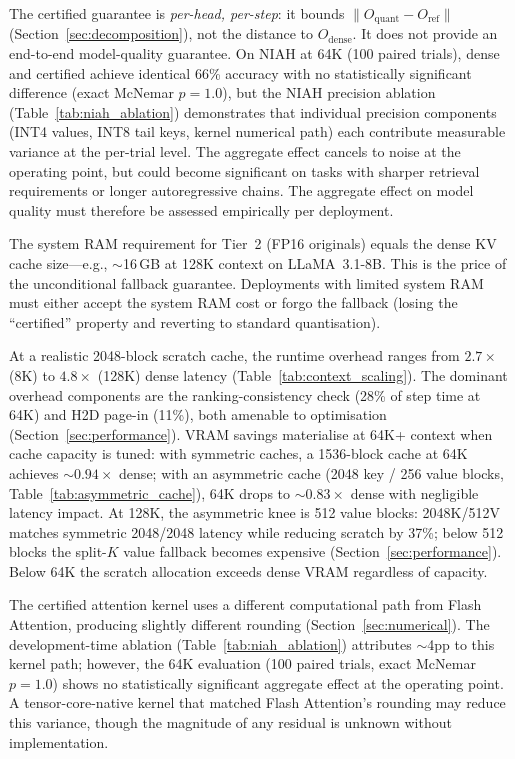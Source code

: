 \documentclass[10pt,twocolumn,a4paper]{article}
\theoremstyle{definition}
\theoremstyle{remark}
\newcommand{\norm}[1]{\lVert #1 \rVert}
\begin{document}
The certified guarantee is \emph{per-head, per-step}: it bounds $\norm{O_{\mathrm{quant}} - O_{\mathrm{ref}}}$ (Section~\ref{sec:decomposition}), not the distance to $O_{\mathrm{dense}}$.  It does not provide an end-to-end model-quality guarantee.  On NIAH at 64K (100 paired trials), dense and certified achieve identical 66\% accuracy with no statistically significant difference (exact McNemar $p{=}1.0$), but the NIAH precision ablation (Table~\ref{tab:niah_ablation}) demonstrates that individual precision components (INT4 values, INT8 tail keys, kernel numerical path) each contribute measurable variance at the per-trial level.  The aggregate effect cancels to noise at the operating point, but could become significant on tasks with sharper retrieval requirements or longer autoregressive chains.  The aggregate effect on model quality must therefore be assessed empirically per deployment.

The system RAM requirement for Tier~2 (FP16 originals) equals the dense KV cache size---e.g., $\sim$16\,GB at 128K context on LLaMA~3.1-8B.  This is the price of the unconditional fallback guarantee.  Deployments with limited system RAM must either accept the system RAM cost or forgo the fallback (losing the ``certified'' property and reverting to standard quantisation).

At a realistic 2048-block scratch cache, the runtime overhead ranges from $2.7\times$ (8K) to $4.8\times$ (128K) dense latency (Table~\ref{tab:context_scaling}).  The dominant overhead components are the ranking-consistency check (28\% of step time at 64K) and H2D page-in (11\%), both amenable to optimisation (Section~\ref{sec:performance}).  VRAM savings materialise at 64K+ context when cache capacity is tuned: with symmetric caches, a 1536-block cache at 64K achieves ${\sim}0.94\times$ dense; with an asymmetric cache (2048 key / 256 value blocks, Table~\ref{tab:asymmetric_cache}), 64K drops to ${\sim}0.83\times$ dense with negligible latency impact.  At 128K, the asymmetric knee is 512 value blocks: 2048K/512V matches symmetric 2048/2048 latency while reducing scratch by 37\%; below 512 blocks the split-$K$ value fallback becomes expensive (Section~\ref{sec:performance}).  Below 64K the scratch allocation exceeds dense VRAM regardless of capacity.

The certified attention kernel uses a different computational path from Flash Attention, producing slightly different rounding (Section~\ref{sec:numerical}).  The development-time ablation (Table~\ref{tab:niah_ablation}) attributes $\sim$4pp to this kernel path; however, the 64K evaluation (100 paired trials, exact McNemar $p{=}1.0$) shows no statistically significant aggregate effect at the operating point.  A tensor-core-native kernel that matched Flash Attention's rounding may reduce this variance, though the magnitude of any residual is unknown without implementation.
\end{document}
